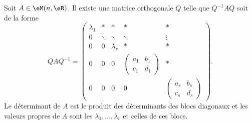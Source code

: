 \begin{lemma}  \label{LemSchureRelnrqfiy}
    Soit \( A\in\eM(n,\eR)\). Il existe une matrice orthogonale \( Q\) telle que \( Q^{-1}AQ\) soit de la forme
    \begin{equation}        \label{EqMtrTSqRTA}
        QAQ^{-1}=\begin{pmatrix}
            \lambda_1    &   *    &   *    &   *    &   *\\
            0    &   \ddots    &   \ddots    &   \ddots    &   \vdots\\
            0    &   0    &   \lambda_r    &   *    &   *\\
            0    &   0    &   0    &   \begin{pmatrix}
                a_1    &   b_1    \\
                c_1    &   d_1
            \end{pmatrix}&   *\\
            0    &   0    &  0     &   0    &   \begin{pmatrix}
                a_s    &   b_s    \\
                c_s    &   d_s
            \end{pmatrix}
        \end{pmatrix}.
    \end{equation}
    Le déterminant de \( A\) est le produit des déterminants des blocs diagonaux et les valeurs propres de \( A\) sont les \( \lambda_1,\ldots, \lambda_r\) et celles de ces blocs.
\end{lemma}

